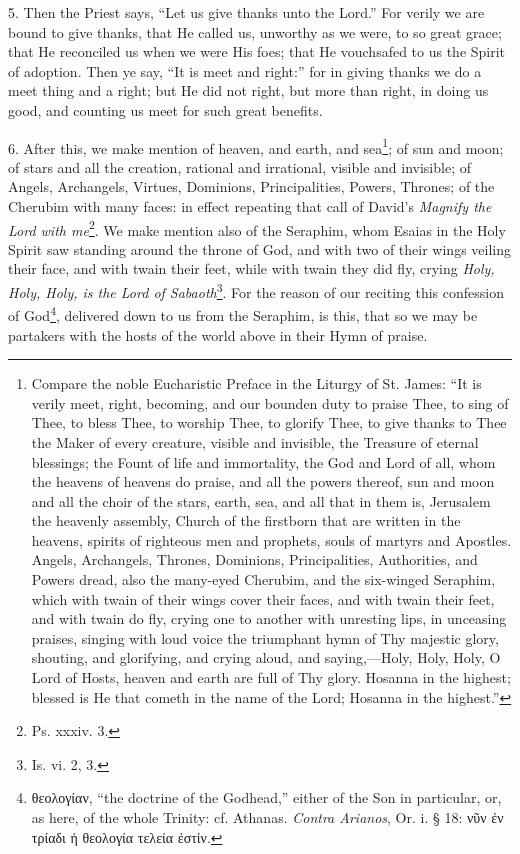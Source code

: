 5. Then the Priest says, “Let us give thanks unto the Lord.” For verily we are bound to give thanks, that He called us, unworthy as we were, to so great grace; that He reconciled us when we were His foes; that He vouchsafed to us the Spirit of adoption. Then ye say, “It is meet and right:” for in giving thanks we do a meet thing and a right; but He did not right, but more than right, in doing us good, and counting us meet for such great benefits.

6. After this, we make mention of heaven, and earth, and sea\footnote{Compare the noble Eucharistic Preface in the Liturgy of St. James: “It is verily meet, right, becoming, and our bounden duty to praise Thee, to sing of Thee, to bless Thee, to worship Thee, to glorify Thee, to give thanks to Thee the Maker of every creature, visible and invisible, the Treasure of eternal blessings; the Fount of life and immortality, the God and Lord of all, whom the heavens of heavens do praise, and all the powers thereof, sun and moon and all the choir of the stars, earth, sea, and all that in them is, Jerusalem the heavenly assembly, Church of the firstborn that are written in the heavens, spirits of righteous men and prophets, souls of martyrs and Apostles. Angels, Archangels, Thrones, Dominions, Principalities, Authorities, and Powers dread, also the many-eyed Cherubim, and the six-winged Seraphim, which with twain of their wings cover their faces, and with twain their feet, and with twain do fly, crying one to another with unresting lips, in unceasing praises, singing with loud voice the triumphant hymn of Thy majestic glory, shouting, and glorifying, and crying aloud, and saying,—Holy, Holy, Holy, O Lord of Hosts, heaven and earth are full of Thy glory. Hosanna in the highest; blessed is He that cometh in the name of the Lord; Hosanna in the highest.”}; of sun and moon; of stars and all the creation, rational and irrational, visible and invisible; of Angels, Archangels, Virtues, Dominions, Principalities, Powers, Thrones; of the Cherubim with many faces: in effect repeating that call of David’s \emph{Magnify the Lord with me}\footnote{Ps. xxxiv. 3.}. We make mention also of the Seraphim, whom Esaias in the Holy Spirit saw standing around the throne of God, and with two of their wings veiling their face, and with twain their feet, while with twain they did fly, crying \emph{Holy, Holy, Holy, is the Lord of Sabaoth}\footnote{Is. vi. 2, 3.}. For the reason of our reciting this confession of God\footnote{\textgreek{θεολογίαν}, “the doctrine of the Godhead,” either of the Son in particular, or, as here, of the whole Trinity: cf. Athanas. \emph{Contra Arianos}, Or. i. § 18: \textgreek{νῦν ἐν τρίαδι ἡ θεολογία τελεία ἐστίν}.}, delivered down to us from the Seraphim, is this, that so we may be partakers with the hosts of the world above in their Hymn of praise.

